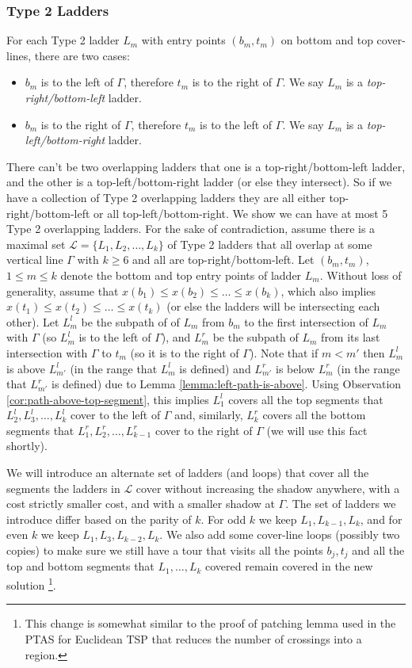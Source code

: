\documentclass[10pt,a4paper]{amsart}
\theoremstyle{thmstyleone}
\begin{document}
    \subsubsection*{Type 2 Ladders}
    For each Type 2 ladder $L_m$ with entry points $(b_m, t_m)$ on bottom and top cover-lines, there are two cases:
    \begin{itemize}
        \item $b_m$ is to the left of $\Gamma$, therefore $t_m$ is to the right of $\Gamma$. We say $L_m$ is a {\em top-right/bottom-left} ladder.
        
        \item $b_m$ is to the right of $\Gamma$, therefore $t_m$ is to the left of $\Gamma$. We say $L_m$ is a {\em top-left/bottom-right} ladder.
    \end{itemize}
    There can't be two overlapping ladders that one is a top-right/bottom-left ladder, and the other is a top-left/bottom-right ladder (or else they intersect). So if we have a collection of Type 2 overlapping ladders they are all either top-right/bottom-left or all top-left/bottom-right. We show we can have at most 5 Type 2 overlapping ladders.
    For the sake of contradiction, assume there is a maximal set $\mathcal L = \{L_1, L_2, \dots, L_k\}$ of Type 2 ladders that all overlap at some vertical line $\Gamma$ with $k\ge 6$ and all are top-right/bottom-left. 
    Let $(b_m, t_m)$, $1\leq m\leq k$ denote the bottom and top entry points of ladder $L_m$. Without loss of generality, assume that $x(b_1) \le x(b_2) \le \dots \le x(b_k)$, which also implies $x(t_1) \le x(t_2) \le \dots \le x(t_k)$ (or else the ladders will be intersecting each other). Let $L^l_m$ be the subpath of of $L_m$ from $b_m$ to the first intersection of $L_m$ with $\Gamma$ (so $L^l_m$ is to the left of $\Gamma$), and $L^r_m$ be the subpath of $L_m$ from its last intersection with $\Gamma$ to $t_m$ (so it is to the right of $\Gamma$).
    Note that if $m<m'$ then $L^l_m$ is above $L^l_{m'}$ (in the range that $L^l_m$ is defined) and $L^r_{m'}$ is below $L^r_{m}$ (in the range that $L^r_{m'}$ is defined) due to Lemma \ref{lemma:left-path-is-above}.
    Using Observation \ref{cor:path-above-top-segment}, this implies $L^l_1$ covers all the top segments that $L^l_2, L^l_3,\dots, L^l_k$ cover to the left of $\Gamma$ and, similarly, $L^r_k$ covers all the bottom segments that $L^r_1, L^r_2,\dots, L^r_{k-1}$ cover to the right of $\Gamma$ (we will use this fact shortly).

    We will introduce an alternate set of ladders (and loops) that cover all the segments the ladders in $\mathcal L$ cover without increasing the shadow anywhere, with a cost strictly smaller cost, and with a smaller shadow at $\Gamma$. The set of ladders we introduce differ based on the parity of $k$. For odd $k$ we keep $L_1,L_{k-1},L_k$, and for even $k$ we keep $L_1,L_3,L_{k-2},L_k$. We also add some cover-line loops (possibly two 
    copies) to make sure we still have a tour that visits all the points $b_j,t_j$ and 
    all the top and bottom segments that $L_1,\ldots,L_k$ covered remain covered in the new solution
    \footnote{This change is somewhat similar to the proof of patching lemma used in the PTAS for Euclidean TSP
    that reduces the number of crossings into a region.}.
\end{document}

